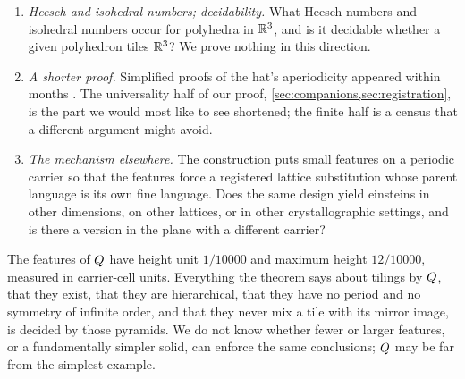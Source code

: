 \begin{enumerate}[label=\textup{(\arabic*)}, leftmargin=*]
    is a pyramid; within the twelve-parameter family of \cref{app:family} the proof does not
    change, and we do not know how far the architecture can be simplified.
  \item \emph{Heesch and isohedral numbers; decidability.} What Heesch numbers and isohedral
    numbers occur for polyhedra in $\mathbb{R}^3$, and is it decidable whether a given polyhedron tiles
    $\mathbb{R}^3$? We prove nothing in this direction.
  \item \emph{A shorter proof.} Simplified proofs of the hat's aperiodicity appeared within
    months \cite{AA25}. The universality half of our proof, \cref{sec:companions,sec:registration},
    is the part we would most like to see shortened; the finite half is a census that a different
    argument might avoid.
  \item \emph{The mechanism elsewhere.} The construction puts small features on a periodic
    carrier so that the features force a registered lattice substitution whose parent language is
    its own fine language. Does the same design yield einsteins in other dimensions, on other
    lattices, or in other crystallographic settings, and is there a version in the plane with a
    different carrier?
\end{enumerate}

The features of $Q$ have height unit $1/10000$ and maximum height $12/10000$, measured in
carrier-cell units. Everything the theorem says about tilings by $Q$, that they exist, that
they are hierarchical, that they have no period and no symmetry of infinite order, and that they
never mix a tile with its mirror image, is decided by those pyramids. We do not know whether
fewer or larger features, or a fundamentally simpler solid, can enforce the same conclusions;
$Q$ may be far from the simplest example.
